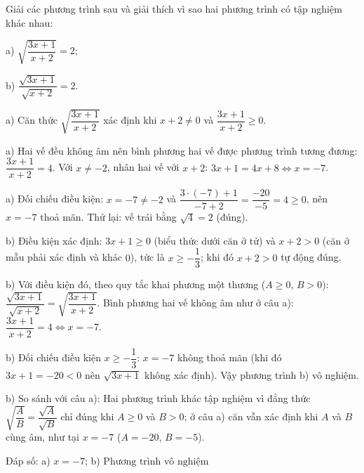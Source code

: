 \begin{problem}[9DS-CAN-022]
Giải các phương trình sau và giải thích vì sao hai phương trình có tập nghiệm khác nhau:

a) $\sqrt{\dfrac{3x + 1}{x + 2}} = 2$;

b) $\dfrac{\sqrt{3x + 1}}{\sqrt{x + 2}} = 2$.

\begin{solution}
a) Căn thức $\sqrt{\dfrac{3x + 1}{x + 2}}$ xác định khi $x + 2 \neq 0$ và $\dfrac{3x + 1}{x + 2} \geq 0$.

a) Hai vế đều không âm nên bình phương hai vế được phương trình tương đương: $\dfrac{3x + 1}{x + 2} = 4$. Với $x \neq -2$, nhân hai vế với $x + 2$: $3x + 1 = 4x + 8 \Leftrightarrow x = -7$.

a) Đối chiếu điều kiện: $x = -7 \neq -2$ và $\dfrac{3 \cdot (-7) + 1}{-7 + 2} = \dfrac{-20}{-5} = 4 \geq 0$, nên $x = -7$ thoả mãn. Thử lại: vế trái bằng $\sqrt{4} = 2$ (đúng).

b) Điều kiện xác định: $3x + 1 \geq 0$ (biểu thức dưới căn ở tử) và $x + 2 > 0$ (căn ở mẫu phải xác định và khác $0$), tức là $x \geq -\dfrac{1}{3}$; khi đó $x + 2 > 0$ tự động đúng.

b) Với điều kiện đó, theo quy tắc khai phương một thương ($A \geq 0$, $B > 0$): $\dfrac{\sqrt{3x + 1}}{\sqrt{x + 2}} = \sqrt{\dfrac{3x + 1}{x + 2}}$. Bình phương hai vế không âm như ở câu a): $\dfrac{3x + 1}{x + 2} = 4 \Leftrightarrow x = -7$.

b) Đối chiếu điều kiện $x \geq -\dfrac{1}{3}$: $x = -7$ không thoả mãn (khi đó $3x + 1 = -20 < 0$ nên $\sqrt{3x + 1}$ không xác định). Vậy phương trình b) vô nghiệm.

b) So sánh với câu a): Hai phương trình khác tập nghiệm vì đẳng thức $\sqrt{\dfrac{A}{B}} = \dfrac{\sqrt{A}}{\sqrt{B}}$ chỉ đúng khi $A \geq 0$ và $B > 0$; ở câu a) căn vẫn xác định khi $A$ và $B$ cùng âm, như tại $x = -7$ ($A = -20$, $B = -5$).

Đáp số: a) $\boxed{x = -7}$; b) $\boxed{\text{Phương trình vô nghiệm}}$
\end{solution}
\end{problem}

